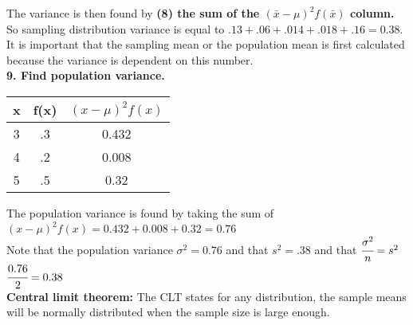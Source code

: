 \documentclass[12pt]{article}
\begin{document}
The variance is then found by \textbf{(8) the sum of the $(\bar{x}-\mu)^{2}f(\bar{x})$ column.} So sampling distribution variance is equal to $.13+.06+.014+.018+.16 = 0.38$. It is important that the sampling mean or the population mean is first calculated because the variance is dependent on this number. \\
\textbf{9. Find population variance.} 


\begin{center}
\begin{tabular}{ |c|c|c| } 
 \hline
 x & f(x) &$(x-\mu)^{2}f(x)$ \\ 
 \hline
 3 & .3 & 0.432\\ 
 4 & .2 & 0.008\\ 
 5 & .5 & 0.32\\
 \hline
\end{tabular}
\end{center}

The population variance is found by taking the sum of $(x-\mu)^{2}f(x) = 0.432+0.008+0.32 = 0.76$ \\

Note that the population variance $\sigma^{2} = 0.76$ and that $s^{2} = .38$ and that $\cfrac{\sigma^{2}}{n}=s^{2}$ \\
$\cfrac{0.76}{2} = 0.38$ \\

\noindent \textbf{Central limit theorem:} The CLT states for any distribution, the sample means will be normally distributed when the sample size is large enough. \\
\end{document}
